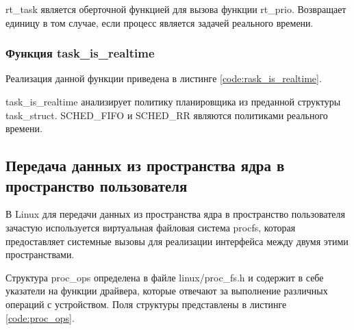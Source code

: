 
rt\_task является оберточной функцией для вызова функции rt\_prio. Возвращает единицу в том случае, если процесс является задачей реального времени.

\subsubsection{Функция task\_is\_realtime}
Реализация данной функции приведена в листинге \ref{code:rask_is_realtime}.


task\_is\_realtime анализирует политику планировщика из преданной структуры task\_struct. SCHED\_FIFO и SCHED\_RR являются политиками реального времени. 

\subsection{Передача данных из пространства ядра в пространство пользователя}
В Linux для передачи данных из пространства ядра в пространство пользователя зачастую используется виртуальная файловая система procfs, которая предоставляет системные вызовы для реализации интерфейса между двумя этими пространствами.

Структура proc\_ops определена в файле linux/proc\_fs.h и содержит в себе указатели на функции драйвера, которые отвечают за выполнение различных операций с устройством. Поля структуры представлены в листинге \ref{code:proc_ops}.


